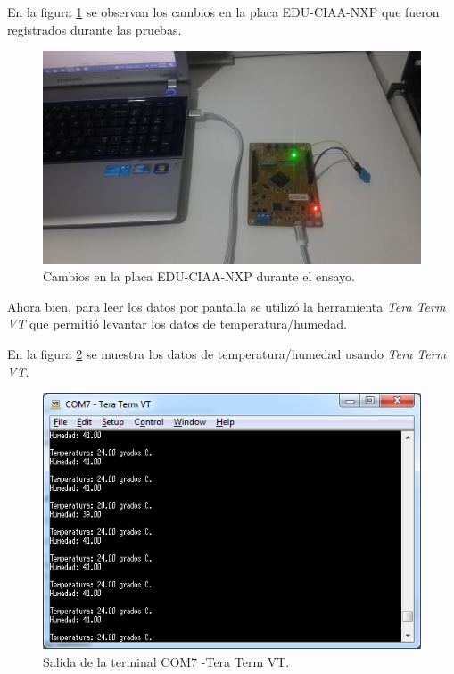 En la figura \ref{fig:TestPlaca} se observan los cambios en la placa EDU-CIAA-NXP que fueron registrados durante las pruebas.


\begin{figure}[ht]
	\centering
	\includegraphics[scale=.50]{./Figures/TestPlaca.jpeg}
	\caption{Cambios en la placa EDU-CIAA-NXP durante el ensayo.}
	\label{fig:TestPlaca}
\end{figure}


Ahora bien, para leer los datos por pantalla se utilizó la herramienta \textit{Tera Term VT} que permitió levantar los datos de temperatura/humedad.

En la figura \ref{fig:TestTerminal} se muestra los datos de temperatura/humedad usando \textit{Tera Term VT}. 


\begin{figure}[ht]
	\centering
	\includegraphics[scale=.90]{./Figures/TestTerminal.png}
	\caption{Salida de la terminal COM7 -Tera Term VT.}
	\label{fig:TestTerminal}
\end{figure}




